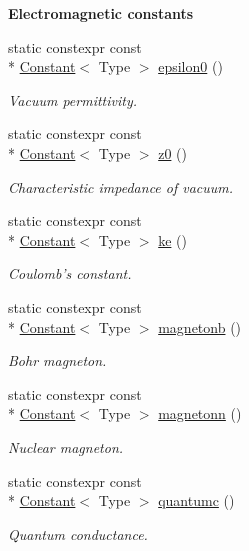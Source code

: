 \begin{Indent}{\bf Electromagnetic constants}
\begin{DoxyCompactItemize}
static constexpr const \\*
\hyperlink{exceptionmagrathea_1_1Constant}{Constant}$<$ Type $>$ \hyperlink{exceptionmagrathea_1_1Constants_aa5ab8875e7379286127f1a03fc55436b}{epsilon0} ()
\begin{DoxyCompactList}\small\item\em Vacuum permittivity. \end{DoxyCompactList}\item 
static constexpr const \\*
\hyperlink{exceptionmagrathea_1_1Constant}{Constant}$<$ Type $>$ \hyperlink{exceptionmagrathea_1_1Constants_a0f625117602d543c9faa1f49209a2fd6}{z0} ()
\begin{DoxyCompactList}\small\item\em Characteristic impedance of vacuum. \end{DoxyCompactList}\item 
static constexpr const \\*
\hyperlink{exceptionmagrathea_1_1Constant}{Constant}$<$ Type $>$ \hyperlink{exceptionmagrathea_1_1Constants_a6b39edef76d19fe0bfa2e36b51afab63}{ke} ()
\begin{DoxyCompactList}\small\item\em Coulomb's constant. \end{DoxyCompactList}\item 
static constexpr const \\*
\hyperlink{exceptionmagrathea_1_1Constant}{Constant}$<$ Type $>$ \hyperlink{exceptionmagrathea_1_1Constants_a2acd29215122a250ff86b0272fc90d15}{magnetonb} ()
\begin{DoxyCompactList}\small\item\em Bohr magneton. \end{DoxyCompactList}\item 
static constexpr const \\*
\hyperlink{exceptionmagrathea_1_1Constant}{Constant}$<$ Type $>$ \hyperlink{exceptionmagrathea_1_1Constants_a96ab4e9059424134c33b9c6561bf72a2}{magnetonn} ()
\begin{DoxyCompactList}\small\item\em Nuclear magneton. \end{DoxyCompactList}\item 
static constexpr const \\*
\hyperlink{exceptionmagrathea_1_1Constant}{Constant}$<$ Type $>$ \hyperlink{exceptionmagrathea_1_1Constants_ad8fd8b715df0b1dd26eecd37ba6a688d}{quantumc} ()
\begin{DoxyCompactList}\small\item\em Quantum conductance. \end{DoxyCompactList}\item 

\end{DoxyCompactItemize}
\end{Indent}
